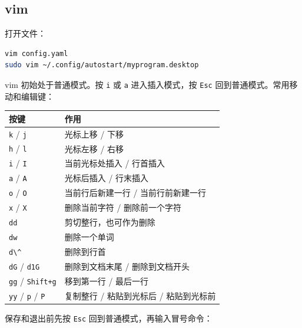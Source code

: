 \subsection{vim}\label{vim}

打开文件：

\begin{lstlisting}[language=bash]
vim config.yaml
sudo vim ~/.config/autostart/myprogram.desktop
\end{lstlisting}

vim 初始处于普通模式。按 \passthrough{\lstinline!i!} 或
\passthrough{\lstinline!a!} 进入插入模式，按
\passthrough{\lstinline!Esc!} 回到普通模式。常用移动和编辑键：

\begin{longtable}[]{@{}ll@{}}
\toprule\noalign{}
按键 & 作用 \\
\midrule\noalign{}
\endhead
\bottomrule\noalign{}
\endlastfoot
\passthrough{\lstinline!k!} / \passthrough{\lstinline!j!} & 光标上移 /
下移 \\
\passthrough{\lstinline!h!} / \passthrough{\lstinline!l!} & 光标左移 /
右移 \\
\passthrough{\lstinline!i!} / \passthrough{\lstinline!I!} &
当前光标处插入 / 行首插入 \\
\passthrough{\lstinline!a!} / \passthrough{\lstinline!A!} & 光标后插入 /
行末插入 \\
\passthrough{\lstinline!o!} / \passthrough{\lstinline!O!} &
当前行后新建一行 / 当前行前新建一行 \\
\passthrough{\lstinline!x!} / \passthrough{\lstinline!X!} & 删除当前字符
/ 删除前一个字符 \\
\passthrough{\lstinline!dd!} & 剪切整行，也可作为删除 \\
\passthrough{\lstinline!dw!} & 删除一个单词 \\
\passthrough{\lstinline!d\^!} & 删除到行首 \\
\passthrough{\lstinline!dG!} / \passthrough{\lstinline!d1G!} &
删除到文档末尾 / 删除到文档开头 \\
\passthrough{\lstinline!gg!} / \passthrough{\lstinline!Shift+g!} &
移到第一行 / 最后一行 \\
\passthrough{\lstinline!yy!} / \passthrough{\lstinline!p!} /
\passthrough{\lstinline!P!} & 复制整行 / 粘贴到光标后 / 粘贴到光标前 \\
\end{longtable}

保存和退出前先按 \passthrough{\lstinline!Esc!}
回到普通模式，再输入冒号命令：

